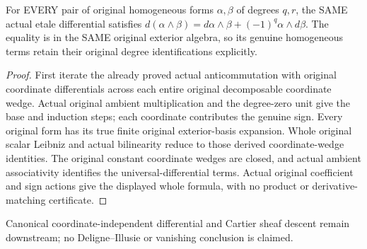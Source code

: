 \begin{theorem}
\label{thm:cartier-etale-original-graded-leibniz}
\leanok
For EVERY pair of original homogeneous forms $\alpha,\beta$ of degrees
$q,r$, the SAME actual etale differential satisfies
$d(\alpha\wedge\beta)=d\alpha\wedge\beta+(-1)^q\alpha\wedge d\beta$.
The equality is in the SAME original exterior algebra, so its genuine
homogeneous terms retain their original degree identifications explicitly.
\end{theorem}
\begin{proof}
First iterate the already proved actual anticommutation with original
coordinate differentials across each entire original decomposable coordinate
wedge. Actual original ambient multiplication and the degree-zero unit give
the base and induction steps; each coordinate contributes the genuine sign.
Every original form has its true finite original exterior-basis expansion.
Whole original scalar Leibniz and actual bilinearity reduce to those derived
coordinate-wedge identities. The original constant coordinate wedges are
closed, and actual ambient associativity identifies the universal-differential
terms. Actual original coefficient and sign actions give the displayed whole
formula, with no product or derivative-matching certificate.
\end{proof}

Canonical coordinate-independent differential and Cartier sheaf descent
remain downstream; no Deligne--Illusie or vanishing conclusion is claimed.
